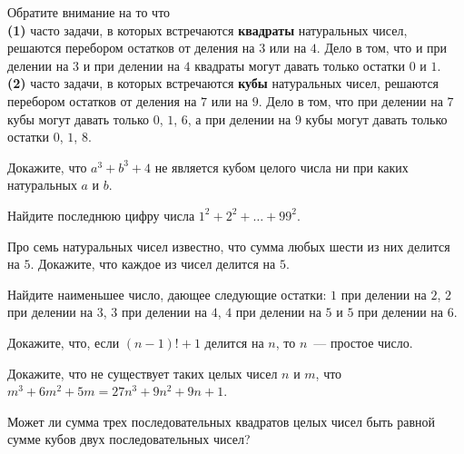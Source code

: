 \observation
Обратите внимание на то что 
\\\textbf{(1)}
часто задачи, в которых встречаются \textbf{квадраты} натуральных чисел,
решаются перебором остатков от деления на $3$ или на $4$.
Дело в том, что и при делении на $3$ и при делении на $4$ квадраты могут давать
только остатки $0$ и $1$.
\\\textbf{(2)}
часто задачи, в которых встречаются \textbf{кубы} натуральных чисел, решаются
перебором остатков от деления на $7$ или на $9$.
Дело в том, что при делении на $7$ кубы могут давать только $0$, $1$, $6$, а
при делении на $9$ кубы могут давать только остатки $0$, $1$, $8$.

\begin{problems}

\item
Докажите, что $a^3 + b^3 + 4$ не является кубом целого числа ни при каких
натуральных $a$ и $b$.

\item
Найдите последнюю цифру числа $1^2 + 2^2 + \ldots + 99^2$.

\item
Про семь натуральных чисел известно, что сумма любых шести из них делится на
$5$.
Докажите, что каждое из чисел делится на $5$.

\item
Найдите наименьшее число, дающее следующие остатки:
$1$ при делении на $2$,
$2$ при делении на $3$,
$3$ при делении на $4$,
$4$ при делении на $5$ и
$5$ при делении на $6$.

\item
Докажите, что, если $(n - 1)! + 1$ делится на $n$, то $n$~--- простое число.

\item
Докажите, что не существует таких целых чисел $n$ и $m$, что
$m^3 + 6 m^2 + 5 m = 27 n^3 + 9 n^2 + 9 n + 1$.

\item
Может ли сумма трех последовательных квадратов целых чисел быть равной сумме
кубов двух последовательных чисел?

\end{problems}

